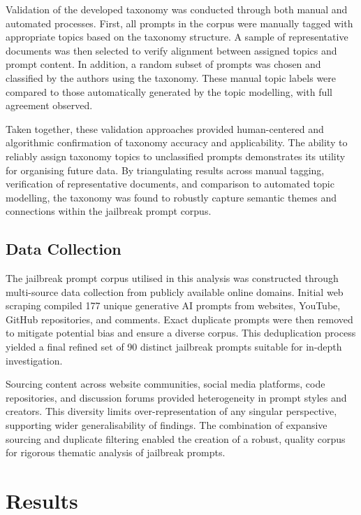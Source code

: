 \documentclass[
  letterpaper,
  DIV=11,
  numbers=noendperiod]{scrartcl}
\begin{document}
Validation of the developed taxonomy was conducted through both manual
and automated processes. First, all prompts in the corpus were manually
tagged with appropriate topics based on the taxonomy structure. A sample
of representative documents was then selected to verify alignment
between assigned topics and prompt content. In addition, a random subset
of prompts was chosen and classified by the authors using the taxonomy.
These manual topic labels were compared to those automatically generated
by the topic modelling, with full agreement observed.

Taken together, these validation approaches provided human-centered and
algorithmic confirmation of taxonomy accuracy and applicability. The
ability to reliably assign taxonomy topics to unclassified prompts
demonstrates its utility for organising future data. By triangulating
results across manual tagging, verification of representative documents,
and comparison to automated topic modelling, the taxonomy was found to
robustly capture semantic themes and connections within the jailbreak
prompt corpus.

\subsection{Data Collection}\label{data-collection}

The jailbreak prompt corpus utilised in this analysis was constructed
through multi-source data collection from publicly available online
domains. Initial web scraping compiled 177 unique generative AI prompts
from websites, YouTube, GitHub repositories, and comments. Exact
duplicate prompts were then removed to mitigate potential bias and
ensure a diverse corpus. This deduplication process yielded a final
refined set of 90 distinct jailbreak prompts suitable for in-depth
investigation.

Sourcing content across website communities, social media platforms,
code repositories, and discussion forums provided heterogeneity in
prompt styles and creators. This diversity limits over-representation of
any singular perspective, supporting wider generalisability of findings.
The combination of expansive sourcing and duplicate filtering enabled
the creation of a robust, quality corpus for rigorous thematic analysis
of jailbreak prompts.

\section{Results}\label{results}
\end{document}
